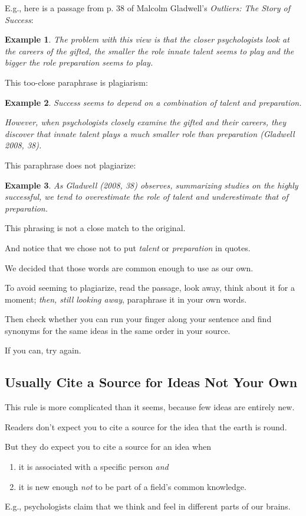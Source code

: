 \documentclass[oneside]{book}
\numberwithin{equation}{section}
\newtheorem{example}{Example}[section]
\begin{document}
%
E.g., here is a passage from p. 38 of Malcolm Gladwell's \textit{Outliers: The Story of Success}:
\begin{example}
    
    The problem with this view is that the closer psychologists look at the careers of the gifted, the smaller the role innate talent seems to play and the bigger the role preparation seems to play.
\end{example}
This too-close paraphrase is plagiarism:
\begin{example}
    Success seems to depend on a combination of talent and preparation.
    
    However, when psychologists closely examine the gifted and their careers, they discover that innate talent plays a much smaller role than preparation (Gladwell 2008, 38).
\end{example}
This paraphrase does not plagiarize:
\begin{example}
    As Gladwell (2008, 38) observes, summarizing studies on the highly successful, we tend to overestimate the role of talent and underestimate that of preparation.
\end{example}
This phrasing is not a close match to the original.

And notice that we chose not to put \textit{talent} or \textit{preparation} in quotes.

We decided that those words are common enough to use as our own.

%
To avoid seeming to plagiarize, read the passage, look away, think about it for a moment; \textit{then, still looking away}, paraphrase it in your own words.

Then check whether you can run your finger along your sentence and find synonyms for the same ideas in the same order in your source.

If you can, try again.

\subsection{Usually Cite a Source for Ideas Not Your Own}
This rule is more complicated than it seems, because few ideas are entirely new.

Readers don't expect you to cite a source for the idea that the earth is round.

But they do expect you to cite a source for an idea when
\begin{enumerate}
    \item it is associated with a specific person \textit{and}
    \item it is new enough \textit{not} to be part of a field's common knowledge.
\end{enumerate}
E.g., psychologists claim that we think and feel in different parts of our brains.
\end{document}
